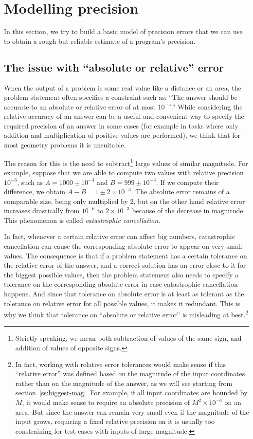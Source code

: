 \section{Modelling precision}
In this section, we try to build a basic model of precision errors that we can use to obtain a rough but reliable estimate of a program's precision.

\subsection{The issue with ``absolute or relative'' error}\label{ss:abs-rel}
When the output of a problem is some real value like a distance or an area, the problem statement often specifies a constraint such as: ``The answer should be accurate to an absolute or relative error of at most $10^{-5}$.'' While considering the relative accuracy of an answer can be a useful and convenient way to specify the required precision of an answer in some cases (for example in tasks where only addition and multiplication of positive values are performed), we think that for most geometry problems it is unsuitable.

The reason for this is the need to subtract\footnote{Strictly speaking, we mean both subtraction of values of the same sign, and addition of values of opposite signs.} large values of similar magnitude. For example, suppose that we are able to compute two values with relative precision $10^{-6}$, such as $A=1000 \pm 10^{-3}$ and $B = 999 \pm 10^{-3}$. If we compute their difference, we obtain $A-B = 1 \pm 2 \times 10^{-3}$. The absolute error remains of a comparable size, being only multiplied by 2, but on the other hand relative error increases drastically from $10^{-6}$ to $2\times 10^{-3}$ because of the decrease in magnitude. This phenomenon is called \emph{catastrophic cancellation}.

In fact, whenever a certain relative error can affect big numbers, catastrophic cancellation can cause the corresponding absolute error to appear on very small values. The consequence is that if a problem statement has a certain tolerance on the relative error of the answer, and a correct solution has an error close to it for the biggest possible values, then the problem statement also needs to specify a tolerance on the corresponding absolute error in case catastrophic cancellation happens. And since that tolerance on absolute error is at least as tolerant as the tolerance on relative error for all possible values, it makes it redundant. This is why we think that tolerance on ``absolute or relative error'' is misleading at best.\footnote{In fact, working with relative error tolerances would make sense if this ``relative error'' was defined based on the magnitude of the input coordinates rather than on the magnitude of the answer, as we will see starting from section~\ref{ss:biggest-mag}. For example, if all input coordinates are bounded by $M$, it would make sense to require an absolute precision of $M^2\times 10^{-6}$ on an area. But since the answer can remain very small even if the magnitude of the input grows, requiring a fixed relative precision on it is usually too constraining for test cases with inputs of large magnitude.}

